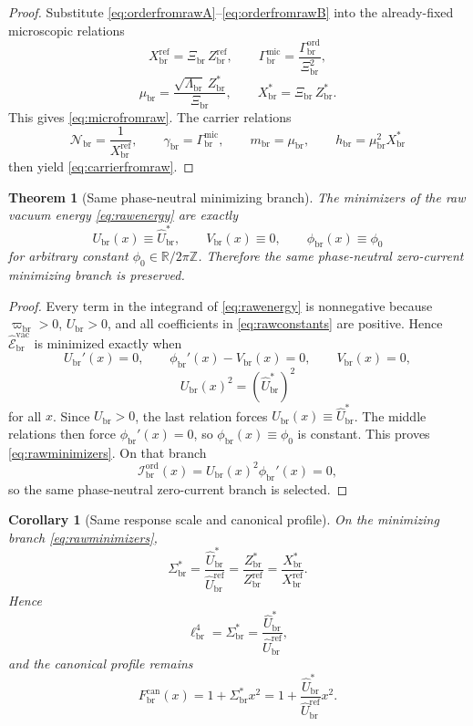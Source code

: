 \documentclass[11pt]{article}
\newcommand{\CurvScale}{\ell_{\mathrm{br}}}
\newcommand{\CurvProfileCan}{F_{\mathrm{br}}^{\mathrm{can}}}
\newcommand{\ProfWeight}{\varpi_{\mathrm{br}}}
\newcommand{\RespSusEq}{\Sigma_{\mathrm{br}}^{\ast}}
\newcommand{\RespNorm}{\mathcal N_{\mathrm{br}}}
\newcommand{\RespFluxCoeff}{\gamma_{\mathrm{br}}}
\newcommand{\RespGap}{m_{\mathrm{br}}}
\newcommand{\RespBias}{h_{\mathrm{br}}}
\newcommand{\RespMicroRef}{X_{\mathrm{br}}^{\mathrm{ref}}}
\newcommand{\RespMicroFluxCoeff}{\Gamma_{\mathrm{br}}^{\mathrm{mic}}}
\newcommand{\RespMicroGap}{\mu_{\mathrm{br}}}
\newcommand{\RespMicroEq}{X_{\mathrm{br}}^{\ast}}
\newcommand{\RespOrderReadout}{\Xi_{\mathrm{br}}}
\newcommand{\RespOrderRef}{Z_{\mathrm{br}}^{\mathrm{ref}}}
\newcommand{\RespOrderStiff}{\Gamma_{\mathrm{br}}^{\mathrm{ord}}}
\newcommand{\RespOrderQuartic}{\Lambda_{\mathrm{br}}}
\newcommand{\RespOrderEq}{Z_{\mathrm{br}}^{\ast}}
\newcommand{\RespOrderCurrent}{\mathcal I_{\mathrm{br}}^{\mathrm{ord}}}
\newcommand{\RespVacAmp}{U_{\mathrm{br}}}
\newcommand{\RespVacPhase}{\phi_{\mathrm{br}}}
\newcommand{\RespVacCarrier}{V_{\mathrm{br}}}
\newcommand{\RespRawRef}{\widehat U_{\mathrm{br}}^{\mathrm{ref}}}
\newcommand{\RespRawEq}{\widehat U_{\mathrm{br}}^{\ast}}
\newcommand{\RespRawEnergy}{\widehat{\mathscr E}_{\mathrm{br}}^{\mathrm{vac}}}
\newtheorem{corollary}{Corollary}
\newtheorem{theorem}{Theorem}
\begin{document}
\begin{proof}
Substitute \eqref{eq:orderfromrawA}--\eqref{eq:orderfromrawB} into the already-fixed microscopic relations
\[
\RespMicroRef=\RespOrderReadout\,\RespOrderRef,
\qquad
\RespMicroFluxCoeff=\frac{\RespOrderStiff}{\RespOrderReadout^2},
\]
\[
\RespMicroGap=\frac{\sqrt{\RespOrderQuartic}\,\RespOrderEq}{\RespOrderReadout},
\qquad
\RespMicroEq=\RespOrderReadout\,\RespOrderEq.
\]
This gives \eqref{eq:microfromraw}. The carrier relations
\[
\RespNorm=\frac{1}{\RespMicroRef},
\qquad
\RespFluxCoeff=\RespMicroFluxCoeff,
\qquad
\RespGap=\RespMicroGap,
\qquad
\RespBias=\RespMicroGap^2\RespMicroEq
\]
then yield \eqref{eq:carrierfromraw}.
\end{proof}

\begin{theorem}[Same phase-neutral minimizing branch]
\label{thm:rawminimizers}
The minimizers of the raw vacuum energy \eqref{eq:rawenergy} are exactly
\begin{equation}
\RespVacAmp(x)\equiv\RespRawEq,
\qquad
\RespVacCarrier(x)\equiv0,
\qquad
\RespVacPhase(x)\equiv\phi_0
\label{eq:rawminimizers}
\end{equation}
for arbitrary constant \(\phi_0\in\mathbb R/2\pi\mathbb Z\). Therefore the same phase-neutral zero-current minimizing branch is preserved.
\end{theorem}

\begin{proof}
Every term in the integrand of \eqref{eq:rawenergy} is nonnegative because \(\ProfWeight>0\), \(\RespVacAmp>0\), and all coefficients in \eqref{eq:rawconstants} are positive. Hence \(\RespRawEnergy\) is minimized exactly when
\[
\RespVacAmp'(x)=0,
\qquad
\RespVacPhase'(x)-\RespVacCarrier(x)=0,
\qquad
\RespVacCarrier(x)=0,
\]
\[
\RespVacAmp(x)^2=(\RespRawEq)^2
\]
for all \(x\). Since \(\RespVacAmp>0\), the last relation forces \(\RespVacAmp(x)\equiv\RespRawEq\). The middle relations then force \(\RespVacPhase'(x)=0\), so \(\RespVacPhase(x)\equiv\phi_0\) is constant. This proves \eqref{eq:rawminimizers}. On that branch
\[
\RespOrderCurrent(x)=\RespVacAmp(x)^2\RespVacPhase'(x)=0,
\]
so the same phase-neutral zero-current branch is selected.
\end{proof}

\begin{corollary}[Same response scale and canonical profile]
\label{cor:rawprofile}
On the minimizing branch \eqref{eq:rawminimizers},
\begin{equation}
\RespSusEq
=
\frac{\RespRawEq}{\RespRawRef}
=
\frac{\RespOrderEq}{\RespOrderRef}
=
\frac{\RespMicroEq}{\RespMicroRef}.
\label{eq:sigmafromraw}
\end{equation}
Hence
\begin{equation}
\CurvScale^4=\RespSusEq=\frac{\RespRawEq}{\RespRawRef},
\label{eq:scalefromraw}
\end{equation}
and the canonical profile remains
\begin{equation}
\CurvProfileCan(x)=1+\RespSusEq x^2=1+\frac{\RespRawEq}{\RespRawRef}x^2.
\label{eq:canonicalprofile}
\end{equation}
\end{corollary}
\end{document}

